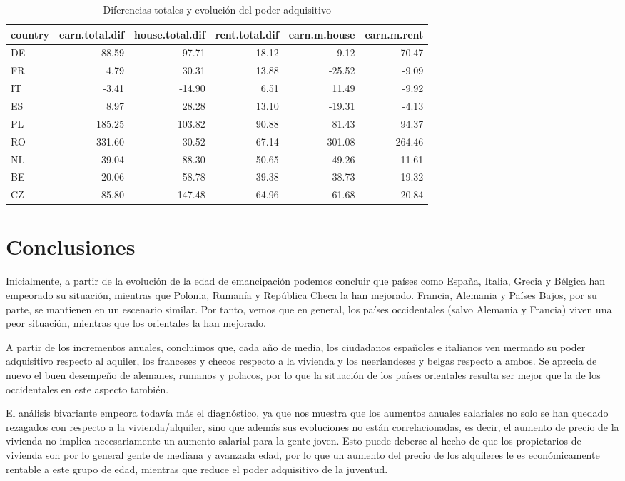\documentclass[water,article,submit,pdftex,moreauthors]{Definitions/mdpi}
\begin{document}
\begin{table}[H]
\centering
\caption{\label{tab:unnamed-chunk-28}Diferencias totales y evolución del poder adquisitivo}
\centering
\begin{tabular}[t]{lrrrrr}
\toprule
country & earn.total.dif & house.total.dif & rent.total.dif & earn.m.house & earn.m.rent\\
\midrule
DE & 88.59 & 97.71 & 18.12 & -9.12 & 70.47\\
FR & 4.79 & 30.31 & 13.88 & -25.52 & -9.09\\
IT & -3.41 & -14.90 & 6.51 & 11.49 & -9.92\\
ES & 8.97 & 28.28 & 13.10 & -19.31 & -4.13\\
PL & 185.25 & 103.82 & 90.88 & 81.43 & 94.37\\
\addlinespace
RO & 331.60 & 30.52 & 67.14 & 301.08 & 264.46\\
NL & 39.04 & 88.30 & 50.65 & -49.26 & -11.61\\
BE & 20.06 & 58.78 & 39.38 & -38.73 & -19.32\\
CZ & 85.80 & 147.48 & 64.96 & -61.68 & 20.84\\
\bottomrule
\end{tabular}
\end{table}

\section{Conclusiones}\label{conclusiones}

Inicialmente, a partir de la evolución de la edad de emancipación
podemos concluir que países como España, Italia, Grecia y Bélgica han
empeorado su situación, mientras que Polonia, Rumanía y República Checa
la han mejorado. Francia, Alemania y Países Bajos, por su parte, se
mantienen en un escenario similar. Por tanto, vemos que en general, los
países occidentales (salvo Alemania y Francia) viven una peor situación,
mientras que los orientales la han mejorado.

A partir de los incrementos anuales, concluimos que, cada año de media,
los ciudadanos españoles e italianos ven mermado su poder adquisitivo
respecto al aquiler, los franceses y checos respecto a la vivienda y los
neerlandeses y belgas respecto a ambos. Se aprecia de nuevo el buen
desempeño de alemanes, rumanos y polacos, por lo que la situación de los
países orientales resulta ser mejor que la de los occidentales en este
aspecto también.

El análisis bivariante empeora todavía más el diagnóstico, ya que nos
muestra que los aumentos anuales salariales no solo se han quedado
rezagados con respecto a la vivienda/alquiler, sino que además sus
evoluciones no están correlacionadas, es decir, el aumento de precio de
la vivienda no implica necesariamente un aumento salarial para la gente
joven. Esto puede deberse al hecho de que los propietarios de vivienda
son por lo general gente de mediana y avanzada edad, por lo que un
aumento del precio de los alquileres le es económicamente rentable a
este grupo de edad, mientras que reduce el poder adquisitivo de la
juventud.
\end{document}
